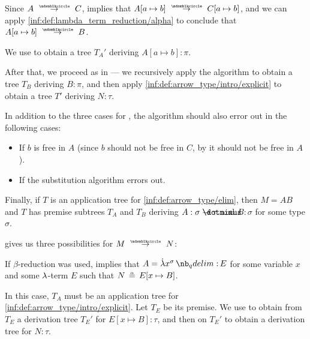 \begin{algorithm}
\begin{thmenum}
\begin{thmenum}
\begin{thmenum}
        Since \( A \pred C \),  implies that \( A[a \mapsto b] \pred C[a \mapsto b] \), and we can apply \ref{inf:def:lambda_term_reduction/alpha} to conclude that \( A[a \mapsto b] \pred B \).

        We use  to obtain a tree \( T_A' \) deriving \( A[a \mapsto b]: \pi \).

        After that, we proceed as in  --- we recursively apply the algorithm to obtain a tree \( T_B \) deriving \( B: \pi \), and then apply \ref{inf:def:arrow_type/intro/explicit} to obtain a tree \( T' \) deriving \( N: \tau \).

        In addition to the three cases for , the algorithm should also error out in the following cases:
        \begin{itemize}
          \item If \( b \) is free in \( A \) (since \( b \) should not be free in \( C \), by  it should not be free in \( A \)).
          \item If the substitution algorithm errors out.
        \end{itemize}
      \end{thmenum}
    \end{thmenum}

     Finally, if \( T \) is an application tree for \ref{inf:def:arrow_type/elim}, then \( M = AB \) and \( T \) has premise subtrees \( T_A \) and \( T_B \) deriving \( A: \sigma \synimplies \tau \) and \( B: \sigma \) for some type \( \sigma \).

     gives us three possibilities for \( M \pred N \):
    \begin{thmenum}
       If \( \beta \)-reduction was used,  implies that \( A = \qabs {x^\sigma} E \) for some variable \( x \) and some \( {\mathrm \lambda} \)-term \( E \) such that \( N \aequiv E[x \mapsto B] \).

      In this case, \( T_A \) must be an application tree for \ref{inf:def:arrow_type/intro/explicit}. Let \( T_E \) be its premise. We use  to obtain from \( T_E \) a derivation tree \( T_E' \) for \( E[x \mapsto B]: \tau \), and then  on \( T_E' \) to obtain a derivation tree for \( N: \tau \).


\end{thmenum}
\end{thmenum}
\end{algorithm}
